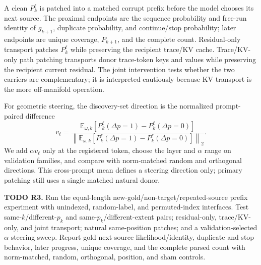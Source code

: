 \documentclass[10pt,twocolumn]{article}
\newcommand{\todoid}[2]{%
  \par\noindent\textcolor{red!75!black}{\textbf{TODO #1.} #2}\par}
\newcommand{\E}{\mathbb{E}}
\begin{document}
A clean $P_k^\ell$ is patched into a matched corrupt prefix before the model chooses its next
source. The proximal endpoints are the sequence probability and free-run identity of $g_{k+1}$,
duplicate probability, and continue/stop probability; later endpoints are unique coverage,
$P_{k+1}$, and the complete count. Residual-only transport patches $P_k^\ell$ while preserving
the recipient trace/KV cache. Trace/KV-only path patching transports donor trace-token keys and
values while preserving the recipient current residual. The joint intervention tests whether
the two carriers are complementary; it is interpreted cautiously because KV transport is the
more off-manifold operation.

For geometric steering, the discovery-set direction is the normalized prompt-paired difference
\[
 v_\ell=
 \frac{\E_{\omega,k}[P_k^\ell(\Delta p=1)-P_k^\ell(\Delta p=0)]}
 {\left\|\E_{\omega,k}[P_k^\ell(\Delta p=1)-P_k^\ell(\Delta p=0)]\right\|_2}.
\]
We add $\alpha v_\ell$ only at the registered token, choose the layer and $\alpha$ range on
validation families, and compare with norm-matched random and orthogonal directions. This
cross-prompt mean defines a steering direction only; primary patching still uses a single
matched natural donor.

\todoid{R3}{Run the equal-length new-gold/non-target/repeated-source prefix experiment with
unindexed, random-label, and permuted-index interfaces. Test same-$k$/different-$p_k$ and
same-$p_k$/different-extent pairs; residual-only, trace/KV-only, and joint transport; natural
same-position patches; and a validation-selected $\alpha$ steering sweep. Report gold
next-source likelihood/identity, duplicate and stop behavior, later progress, unique coverage,
and the complete parsed count with norm-matched, random, orthogonal, position, and sham
controls.}
\end{document}
